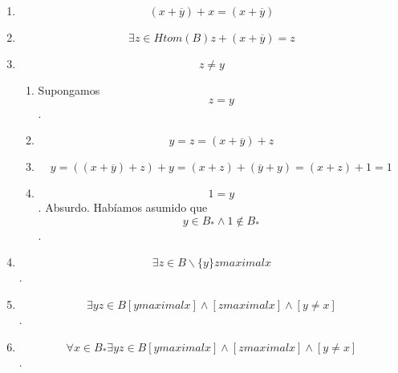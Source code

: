 \documentclass[
]{article}
\providecommand{\tightlist}{%
  \setlength{\itemsep}{0pt}\setlength{\parskip}{0pt}}
\begin{document}
\begin{enumerate}
\begin{enumerate}
\begin{enumerate}
\begin{enumerate}
\begin{enumerate}
          \begin{enumerate}
          \def\labelenumvi{\arabic{enumvi}.}
          \tightlist
          \item
            \[{y \cdot \overline{y}} = 0\]
          \item
            \[{{x + {({y \cdot \overline{y}})}} = {x + 0}} = x\]
          \item
            \[{{x = {{({x + y})} \cdot {({x + \overline{y}})}}} = {{({x + y})} \cdot 1}} = y\]
          \item
            \[x = y\]. Absurdo. Habíamos asumido que
            \[{y \in \mathit{Htom}}{{{(B)} \land x} \notin \mathit{Htom}}{(B)}\].
          \end{enumerate}
        \end{enumerate}
      \item
        \[{{({x + \overline{y}})} + x} = {({x + \overline{y}})}\]
      \item
        \[\exists{z \in \mathit{Htom}}{(B)}{{z + {({x + \overline{y}})}} = z}\]
      \item
        \[z \neq y\]

        \begin{enumerate}
        \def\labelenumv{\arabic{enumv}.}
        \tightlist
        \item
          Supongamos \[z = y\].
        \item
          \[{y = z} = {{({x + \overline{y}})} + z}\]
        \item
          \[{{{y = {{({{({x + \overline{y}})} + z})} + y}} = {{({x + z})} + {({\overline{y} + y})}}} = {{({x + z})} + 1}} = 1\]
        \item
          \[1 = y\]. Absurdo. Habíamos asumido que
          \[{y \in {B_{\ast} \land 1}} \notin B_{\ast}\].
        \end{enumerate}
      \item
        \[\exists{z \in {B \smallsetminus {\{ y\}}}}z\mathsf{\mathit{maximal}}x\].
      \item
        \[\exists{\mathit{yz} \in B}{{\left\lbrack {y\mathsf{\mathit{maximal}}x} \right\rbrack \land \left\lbrack {z\mathsf{\mathit{maximal}}x} \right\rbrack} \land \left\lbrack {y \neq x} \right\rbrack}\].
      \item
        \[\forall{x \in B_{\ast}}\exists{\mathit{yz} \in B}{{\left\lbrack {y\mathsf{\mathit{maximal}}x} \right\rbrack \land \left\lbrack {z\mathsf{\mathit{maximal}}x} \right\rbrack} \land \left\lbrack {y \neq x} \right\rbrack}\].
      \end{enumerate}
    \end{enumerate}


\end{enumerate}
\end{enumerate}
\end{document}
